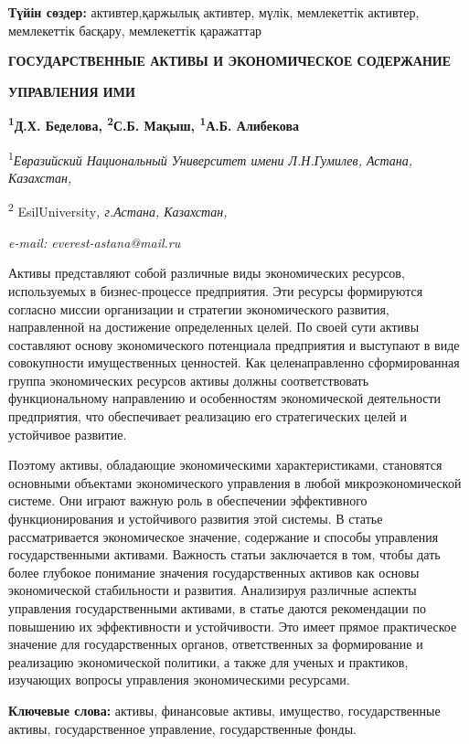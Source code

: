 {{\bfseries Түйін сөздер:} активтер,қаржылық активтер, мүлік, мемлекеттік
активтер, мемлекеттік басқару, мемлекеттік қаражаттар

{\bfseries ГОСУДАРСТВЕННЫЕ АКТИВЫ И ЭКОНОМИЧЕСКОЕ СОДЕРЖАНИЕ}

{\bfseries УПРАВЛЕНИЯ ИМИ}

{\bfseries \textsuperscript{1}Д.Х. Беделова\textsuperscript{\envelope },
\textsuperscript{2}С.Б. Мақыш, \textsuperscript{1}А.Б. Алибекова}

\textsuperscript{1}\emph{Евразийский Национальный Университет имени
Л.Н.Гумилев, Астана, Казахстан,}

\textsuperscript{2} EsilUniversity\emph{, г.Астана, Казахстан,}

\emph{e-mail: everest-astana@mail.ru}

Активы представляют собой различные виды экономических ресурсов,
используемых в бизнес-процессе предприятия. Эти ресурсы формируются
согласно миссии организации и стратегии экономического развития,
направленной на достижение определенных целей. По своей сути активы
составляют основу экономического потенциала предприятия и выступают в
виде совокупности имущественных ценностей. Как целенаправленно
сформированная группа экономических ресурсов активы должны
соответствовать функциональному направлению и особенностям экономической
деятельности предприятия, что обеспечивает реализацию его стратегических
целей и устойчивое развитие.

Поэтому активы, обладающие экономическими характеристиками, становятся
основными объектами экономического управления в любой микроэкономической
системе. Они играют важную роль в обеспечении эффективного
функционирования и устойчивого развития этой системы. В статье
рассматривается экономическое значение, содержание и способы управления
государственными активами. Важность статьи заключается в том, чтобы дать
более глубокое понимание значения государственных активов как основы
экономической стабильности и развития. Анализируя различные аспекты
управления государственными активами, в статье даются рекомендации по
повышению их эффективности и устойчивости. Это имеет прямое практическое
значение для государственных органов, ответственных за формирование и
реализацию экономической политики, а также для ученых и практиков,
изучающих вопросы управления экономическими ресурсами.

{\bfseries Ключевые слова:} активы, финансовые активы, имущество,
государственные активы, государственное управление, государственные
фонды.

}
